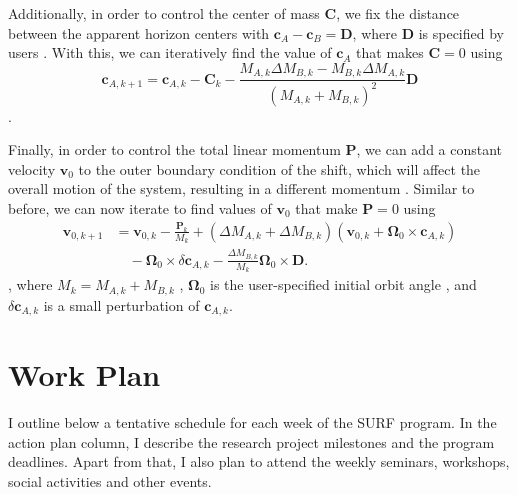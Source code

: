 \documentclass{../letter}
\renewcommand{\v}[1]{\boldsymbol{#1}}
\begin{document}
	Additionally, in order to control the center of mass $\v C$, we fix the distance between the apparent horizon centers with $\v c_A - \v c_B = \v D$, where $\v D$ is specified by users \cite{Serguei}. With this, we can iteratively find the value of $\v c_A$ that makes $\v C = 0$ using
	\begin{equation}
		\v c_{A,k+1} = \v c_{A,k} - \v C_k - \frac{M_{A,k}  \Delta M_{B,k} - M_{B,k} \Delta M_{A,k}}{(M_{A,k} + M_{B,k})^2} \v D
	\end{equation}
	\cite{Serguei}.

	Finally, in order to control the total linear momentum $\v P$, we can add a constant velocity $\v v_0$ to the outer boundary condition of the shift, which will affect the overall motion of the system, resulting in a different momentum \cite{Serguei}. Similar to before, we can now iterate to find values of $\v v_0$ that make $\v P = 0$ using
	\begin{equation}
		\begin{aligned}
			\v v_{0,k+1} &= \v v_{0,k} - \frac{\v P_k}{M_k} + (\Delta M_{A,k} + \Delta M_{B,k}) (\v v_{0,k} + \v\Omega_0 \times \v c_{A,k}) \\
			&\quad - \v\Omega_0 \times \delta \v c_{A,k} - \frac{\Delta M_{B,k}}{M_k} \v\Omega_0 \times \v D.
		\end{aligned}
		\end{equation}
	\cite{Serguei}, where $M_k = M_{A,k} + M_{B,k}$ , $\v \Omega_0$ is the user-specified initial orbit angle , and $\delta \v c_{A,k}$ is a small perturbation of $\v c_{A,k}$.

	\section{Work Plan}

	I outline below a tentative schedule for each week of the SURF program. In the action plan column, I describe the research project milestones and the program deadlines. Apart from that, I also plan to attend the weekly seminars, workshops, social activities and other events.
\end{document}
